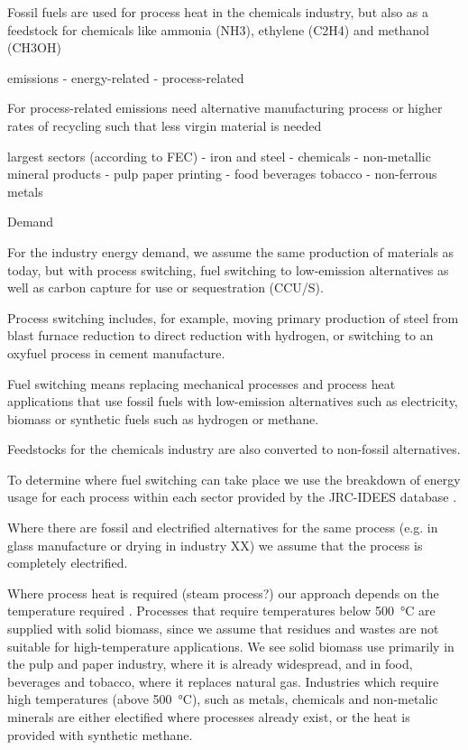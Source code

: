 Fossil fuels are used for process heat in the chemicals industry, but also as a feedstock for chemicals like
ammonia (NH3), ethylene (C2H4) and methanol (CH3OH)

emissions
- energy-related
- process-related

For process-related emissions need alternative manufacturing process
or higher rates of recycling such that less virgin material is needed

largest sectors (according to FEC)
- iron and steel
- chemicals
- non-metallic mineral products
- pulp paper printing
- food beverages tobacco
- non-ferrous metals

Demand

For the industry energy demand, we assume the same
production of materials as today, but with process switching, fuel switching to
low-emission alternatives as well as carbon capture for use or sequestration
(CCU/S).

Process switching includes, for example, moving primary production of
steel from blast furnace reduction to direct reduction with hydrogen, or
switching to an oxyfuel process in cement manufacture.

Fuel switching means
replacing mechanical processes and process heat applications that use fossil
fuels with low-emission alternatives such as electricity, biomass or synthetic
fuels such as hydrogen or methane.

Feedstocks for the chemicals industry are
also converted to non-fossil alternatives.

To determine where fuel switching can take place we use the breakdown of energy
usage for each process within each sector provided by the JRC-IDEES database
.

Where there are fossil and electrified alternatives for the same
process (e.g. in glass manufacture or drying in industry XX) we assume that the
process is completely electrified.

Where process heat is required (steam
process?) our approach depends on the temperature required
. Processes that require temperatures below
\SI{500}{\celsius} are supplied with solid biomass, since we assume that residues and
wastes are not suitable for high-temperature applications. We see solid biomass
use primarily in the pulp and paper industry, where it is already widespread,
and in food, beverages and tobacco, where it replaces natural gas. Industries
which require high temperatures (above \SI{500}{\celsius}), such as metals, chemicals
and non-metalic minerals are either electified where processes already exist, or
the heat is provided with synthetic methane.

